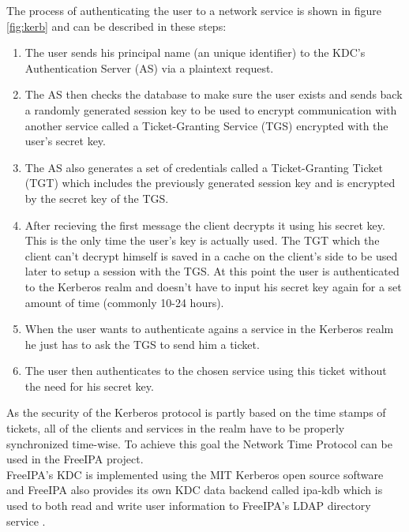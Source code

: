 The process of authenticating the user to a network service is shown in figure \ref{fig:kerb} and can be described in these steps:
\begin{enumerate}
    \item The user sends his principal name (an unique identifier) to the KDC's Authentication Server (AS) via a plaintext request.
    \item The AS then checks the database to make sure the user exists and sends back a randomly generated session key to be used to encrypt communication with another service called a Ticket-Granting Service (TGS) encrypted with the user's secret key.
    \item The AS also generates a set of credentials called a Ticket-Granting Ticket (TGT) which includes the previously generated session key and is encrypted by the secret key of the TGS.
    \item After recieving the first message the client decrypts it using his secret key. This is the only time the user's key is actually used. The TGT which the client can't decrypt himself is saved in a cache on the client's side to be used later to setup a session with the TGS. At this point the user is authenticated to the Kerberos realm and doesn't have to input his secret key again for a set amount of time (commonly 10-24 hours).
    \item When the user wants to authenticate agains a service in the Kerberos realm he just has to ask the TGS to send him a ticket.
    \item The user then authenticates to the chosen service using this ticket without the need for his secret key.
\end{enumerate}

As the security of the Kerberos protocol is partly based on the time stamps of tickets, all of the clients and services in the realm have to be properly synchronized time-wise.
To achieve this goal the Network Time Protocol can be used in the FreeIPA project. \\
FreeIPA's KDC is implemented using the MIT Kerberos \cite{kerbWeb} open source software and FreeIPA also provides its own KDC data backend called ipa-kdb which is used to both read and write user information to FreeIPA's LDAP directory service \cite{kerbIpa}.

